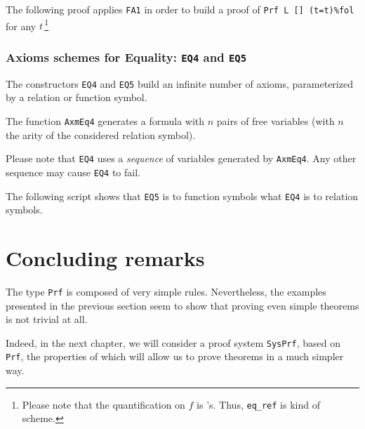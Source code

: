 The following proof applies \texttt{FA1} in order to build a proof
of \texttt{Prf L [] (t=t)\%fol}  for any $t$\,\footnote{Please note that the quantification on $f$ is \coq's. Thus, \texttt{eq\_ref} is kind of scheme.}



\subsubsection{Axioms schemes for Equality: \texttt{EQ4} and \texttt{EQ5}}

The constructors \texttt{EQ4}  and \texttt{EQ5} build an infinite number of axioms, parameterized by a  relation  or function symbol.

The function \texttt{AxmEq4} generates a formula with $n$ pairs of free variables (with $n$ the arity of the considered relation symbol).


Please note that \texttt{EQ4} uses a \emph{sequence} of variables generated by \texttt{AxmEq4}. Any other sequence may cause 
\texttt{EQ4} to fail.


The following script shows that \texttt{EQ5} is to function symbols 
what \texttt{EQ4} is to relation symbols.





\section{Concluding remarks}

The type \texttt{Prf} is composed of very simple rules.
Nevertheless, the examples presented in the previous section seem to show that proving even simple theorems is not trivial at all.


Indeed, in the next chapter, we will consider a proof system
\texttt{SysPrf}, based on \texttt{Prf}, the properties of which will 
allow us to prove theorems in a much simpler way.











